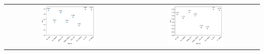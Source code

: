 \begin{table}[h! ]
\begin{tabular}{c c}
         \includegraphics[width=0.45\textwidth]{figures/N100_T50_DGP5_Sims1000} &
         \includegraphics[width=0.45\textwidth]{figures/N100_T50_DGP6_Sims1000}
     \end{tabular}
\end{table}

